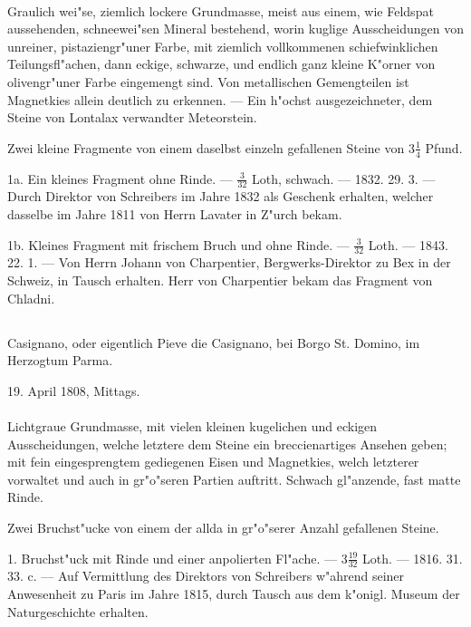 \documentclass[a4paper, 11pt, oneside, polutonikogreek, german]{article}
\begin{document}
\paragraph{}
Graulich wei"se, ziemlich lockere Grundmasse, meist aus einem, wie Feldspat aussehenden, schneewei"sen Mineral bestehend‚ worin kuglige Ausscheidungen von unreiner, pistaziengr"uner Farbe, mit ziemlich vollkommenen schiefwinklichen Teilungsfl"achen, dann eckige, schwarze, und endlich ganz kleine K"orner von olivengr"uner Farbe eingemengt sind. Von metallischen Gemengteilen ist Magnetkies allein deutlich zu erkennen. --- Ein h"ochst ausgezeichneter, dem Steine von Lontalax verwandter Meteorstein.

Zwei kleine Fragmente von einem daselbst einzeln gefallenen Steine von $3\frac{1}{4}$ Pfund.

1a. Ein kleines Fragment ohne Rinde. --- $\frac{3}{32}$ Loth, schwach. --- 1832. 29. 3. --- Durch Direktor von Schreibers im Jahre 1832 als Geschenk erhalten, welcher dasselbe im Jahre 1811 von Herrn Lavater in Z"urch bekam.

1b. Kleines Fragment mit frischem Bruch und ohne Rinde. --- $\frac{3}{32}$ Loth. --- 1843. 22. 1. --- Von Herrn Johann von Charpentier, Bergwerks-Direktor zu Bex in der Schweiz, in Tausch erhalten. Herr von Charpentier bekam das Fragment von Chladni.
\subsection{}
\begin{center}

Casignano, oder eigentlich Pieve die Casignano, bei Borgo St. Domino, im Herzogtum Parma.

19. April 1808, Mittags.
\end{center}
\paragraph{}
Lichtgraue Grundmasse, mit vielen kleinen kugelichen und eckigen Ausscheidungen, welche letztere dem Steine ein breccienartiges Ansehen geben; mit fein eingesprengtem gediegenen Eisen und Magnetkies, welch letzterer vorwaltet und auch in gr"o"seren Partien auftritt. Schwach gl"anzende, fast matte Rinde.

Zwei Bruchst"ucke von einem der allda in gr"o"serer Anzahl gefallenen Steine.

1. Bruchst"uck mit Rinde und einer anpolierten Fl"ache. --- $3\frac{19}{32}$ Loth. --- 1816. 31. 33. c. --- Auf Vermittlung des Direktors von Schreibers w"ahrend seiner Anwesenheit zu Paris im Jahre 1815, durch Tausch aus dem k"onigl. Museum der Naturgeschichte erhalten.
\end{document}
